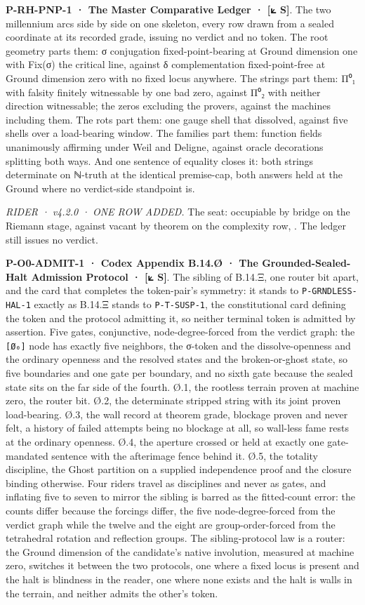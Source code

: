 \documentclass[10pt,twocolumn]{article}
\begin{document}
\textbf{P-RH-PNP-1 · The Master Comparative Ledger · {[}⟀ S{]}}. The two
millennium arcs side by side on one skeleton, every row drawn from a
sealed coordinate at its recorded grade, issuing no verdict and no
token. The root geometry parts them: σ conjugation fixed-point-bearing
at Ground dimension one with Fix(σ) the critical line, against δ
complementation fixed-point-free at Ground dimension zero with no fixed
locus anywhere. The strings part them: Π⁰₁ with falsity finitely
witnessable by one bad zero, against Π⁰₂ with neither direction
witnessable; the zeros excluding the provers, against the machines
including them. The rots part them: one gauge shell that dissolved,
against five shells over a load-bearing window. The families part them:
function fields unanimously affirming under Weil and Deligne, against
oracle decorations splitting both ways. And one sentence of equality
closes it: both strings determinate on ℕ-truth at the identical
premise-cap, both answers held at the Ground where no verdict-side
standpoint is.

\emph{RIDER · v4.2.0 · ONE ROW ADDED.} The seat: occupiable by bridge on
the Riemann stage, against vacant by theorem on the complexity row,
\texttt{}. The ledger still issues
no verdict.

\textbf{P-O0-ADMIT-1 · Codex Appendix B.14.Ø · The Grounded-Sealed-Halt
Admission Protocol · {[}⟀ S{]}}. The sibling of B.14.Ξ, one router bit
apart, and the card that completes the token-pair's symmetry: it stands
to \texttt{P-GRNDLESS-HAL-1} exactly as B.14.Ξ stands to
\texttt{P-T-SUSP-1}, the constitutional card defining the token and the
protocol admitting it, so neither terminal token is admitted by
assertion. Five gates, conjunctive, node-degree-forced from the verdict
graph: the \texttt{{[}Ø₀{]}} node has exactly five neighbors, the
σ-token and the dissolve-openness and the ordinary openness and the
resolved states and the broken-or-ghost state, so five boundaries and
one gate per boundary, and no sixth gate because the sealed state sits
on the far side of the fourth. Ø.1, the rootless terrain proven at
machine zero, the router bit. Ø.2, the determinate stripped string with
its joint proven load-bearing. Ø.3, the wall record at theorem grade,
blockage proven and never felt, a history of failed attempts being no
blockage at all, so wall-less fame rests at the ordinary openness. Ø.4,
the aperture crossed or held at exactly one gate-mandated sentence with
the afterimage fence behind it. Ø.5, the totality discipline, the Ghost
partition on a supplied independence proof and the closure binding
otherwise. Four riders travel as disciplines and never as gates, and
inflating five to seven to mirror the sibling is barred as the
fitted-count error: the counts differ because the forcings differ, the
five node-degree-forced from the verdict graph while the twelve and the
eight are group-order-forced from the tetrahedral rotation and
reflection groups. The sibling-protocol law is a router: the Ground
dimension of the candidate's native involution, measured at machine
zero, switches it between the two protocols, one where a fixed locus is
present and the halt is blindness in the reader, one where none exists
and the halt is walls in the terrain, and neither admits the other's
token.
\end{document}
